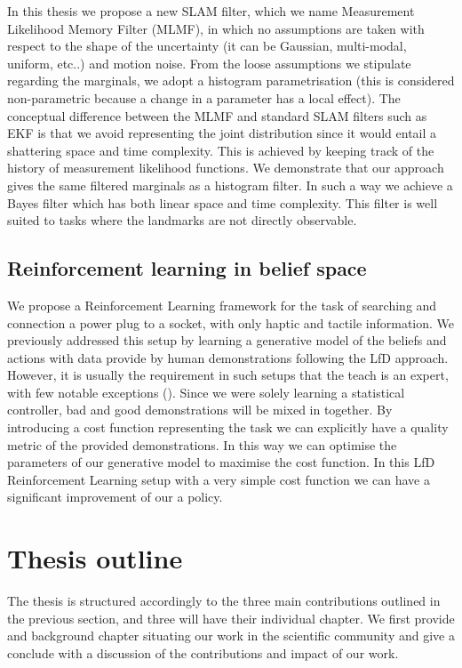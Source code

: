 In this thesis we propose a new SLAM filter, which we name Measurement Likelihood Memory Filter (MLMF), in 
which no assumptions are taken with respect to the shape of the uncertainty (it can be Gaussian, multi-modal, uniform, etc..) and 
motion noise. From the loose assumptions we stipulate regarding the marginals, we adopt a histogram parametrisation (this is considered non-parametric 
because a change in a parameter has a local effect). The conceptual difference between the MLMF and standard SLAM filters 
such as EKF is that we avoid representing the joint distribution since it would entail a shattering space and time complexity. 
This is achieved by keeping track of the history of measurement likelihood functions. We demonstrate that our approach gives 
the same filtered marginals as a histogram filter. In such a way we achieve a Bayes filter which has both linear space and 
time complexity. This filter is well suited to tasks where the landmarks are not directly observable.

\subsection{Reinforcement learning in belief space}

We propose a Reinforcement Learning framework for the task of searching and connection a power plug to a socket, with only haptic 
and tactile information. We previously addressed this setup by learning a generative model of the beliefs and actions with data 
provide by human demonstrations following the LfD approach. However, it is usually the requirement in such setups that 
the teach is an expert, with few notable exceptions (\cite{rai2013learning}). Since we were solely learning a 
statistical controller, bad and good demonstrations will be mixed in together. By introducing a cost function 
representing the task we can explicitly have a quality metric of the provided demonstrations. In this way 
we can optimise the parameters of our generative model to maximise the cost function. In this LfD Reinforcement 
Learning setup with a very simple cost function we can have a significant improvement of our a policy.

\section{Thesis outline}

The thesis is structured accordingly to the three main contributions outlined in the previous section, 
and three will have their individual chapter. We first provide and background chapter situating our work 
in the scientific community and give a conclude with a discussion of the contributions and impact of 
our work.

